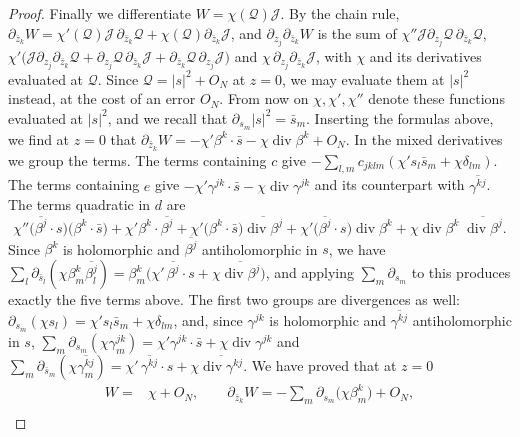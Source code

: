 \begin{proof}
Finally we differentiate $W=\chi(\mathcal Q)\mathcal J$. By the chain rule, $\partial_{\bar z_k}W=\chi'(\mathcal Q)\mathcal J\,\partial_{\bar z_k}\mathcal Q+\chi(\mathcal Q)\partial_{\bar z_k}\mathcal J$, and $\partial_{z_j}\partial_{\bar z_k}W$ is the sum of $\chi''\mathcal J\partial_{z_j}\mathcal Q\,\partial_{\bar z_k}\mathcal Q$, $\chi'\bigl(\mathcal J\partial_{z_j}\partial_{\bar z_k}\mathcal Q+\partial_{z_j}\mathcal Q\,\partial_{\bar z_k}\mathcal J+\partial_{\bar z_k}\mathcal Q\,\partial_{z_j}\mathcal J\bigr)$ and $\chi\,\partial_{z_j}\partial_{\bar z_k}\mathcal J$, with $\chi$ and its derivatives evaluated at $\mathcal Q$. Since $\mathcal Q=|s|^2+O_N$ at $z=0$, we may evaluate them at $|s|^2$ instead, at the cost of an error $O_N$. From now on $\chi,\chi',\chi''$ denote these functions evaluated at $|s|^2$, and we recall that $\partial_{s_m}|s|^2=\bar s_m$. Inserting the formulas above, we find at $z=0$ that $\partial_{\bar z_k}W=-\chi'\beta^k\cdot\bar s-\chi\operatorname{div}\beta^k+O_N$. In the mixed derivatives we group the terms. The terms containing $c$ give $-\sum_{l,m}c_{jklm}(\chi's_l\bar s_m+\chi\delta_{lm})$. The terms containing $e$ give $-\chi'\gamma^{jk}\cdot\bar s-\chi\operatorname{div}\gamma^{jk}$ and its counterpart with $\overline{\gamma^{kj}}$. The terms quadratic in $d$ are
\[
 \chi''\bigl(\overline{\beta^j}\cdot s\bigr)\bigl(\beta^k\cdot\bar s\bigr)+\chi'\beta^k\cdot\overline{\beta^j}+\chi'\bigl(\beta^k\cdot\bar s\bigr)\overline{\operatorname{div}\beta^j}+\chi'\bigl(\overline{\beta^j}\cdot s\bigr)\operatorname{div}\beta^k+\chi\operatorname{div}\beta^k\;\overline{\operatorname{div}\beta^j}.
\]
Since $\beta^k$ is holomorphic and $\overline{\beta^j}$ antiholomorphic in $s$, we have $\sum_l\partial_{\bar s_l}(\chi\beta^k_m\overline{\beta^j_l})=\beta^k_m\bigl(\chi'\,\overline{\beta^j}\cdot s+\chi\overline{\operatorname{div}\beta^j}\bigr)$, and applying $\sum_m\partial_{s_m}$ to this produces exactly the five terms above. The first two groups are divergences as well: $\partial_{s_m}(\chi s_l)=\chi's_l\bar s_m+\chi\delta_{lm}$, and, since $\gamma^{jk}$ is holomorphic and $\overline{\gamma^{kj}}$ antiholomorphic in $s$, $\sum_m\partial_{s_m}(\chi\gamma^{jk}_m)=\chi'\gamma^{jk}\cdot\bar s+\chi\operatorname{div}\gamma^{jk}$ and $\sum_m\partial_{\bar s_m}(\chi\overline{\gamma^{kj}_m})=\chi'\,\overline{\gamma^{kj}}\cdot s+\chi\overline{\operatorname{div}\gamma^{kj}}$. We have proved that at $z=0$
\begin{equation}\label{eq:chern-weight-jet}
\begin{aligned}
 W={}&\chi+O_N,\qquad \partial_{\bar z_k}W=-\sum_m\partial_{s_m}\bigl(\chi\beta^k_m\bigr)+O_N,\\

\end{aligned}
\end{equation}
\end{proof}
